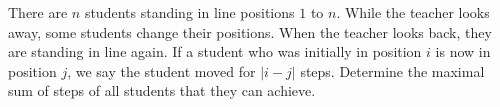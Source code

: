 There are $n$ students standing in line positions $1$ to $n$. While the teacher looks away, some students change their positions. When the teacher looks back, they are standing in line again. If a student who was initially in position $i$ is now in position $j$,  we say the student moved for $|i-j|$ steps. Determine the maximal sum of steps of all students that they can achieve.